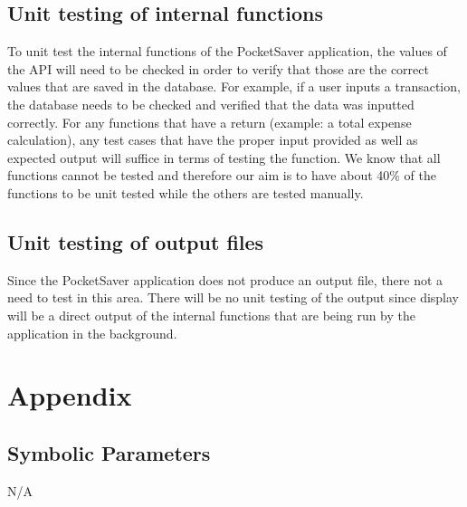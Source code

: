 \documentclass[12pt, titlepage]{article}
\begin{document}
\subsection{Unit testing of internal functions}

To unit test the internal functions of the PocketSaver application, the values of the API will need to be checked in order to verify that those are the correct values that are saved in the database. For example, if a user inputs a transaction, the database needs to be checked and verified that the data was inputted correctly. For any functions that have a return (example: a total expense calculation), any test cases that have the proper input provided as well as expected output will suffice in terms of testing the function. We know that all functions cannot be tested and therefore our aim is to have about 40\% of the functions to be unit tested while the others are tested manually.
		
\subsection{Unit testing of output files}	
Since the PocketSaver application does not produce an output file, there not a need to test in this area. There will be no unit testing of the output since display will be a direct output of the internal functions that are being run by the application in the background.	





\newpage

\section{Appendix}


\subsection{Symbolic Parameters}
N/A
\end{document}

